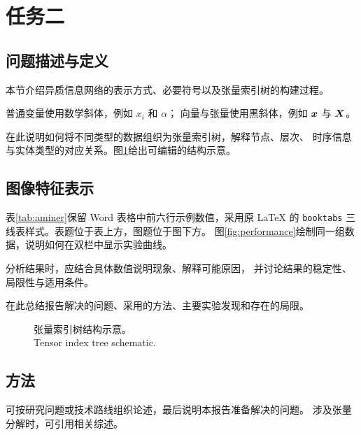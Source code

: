 \documentclass[sigconf,nonacm,screen]{acmart}
\begin{document}
\section{任务二}
\label{sec:task2}
\subsection{问题描述与定义}
\label{sec:task2-problem}
本节介绍异质信息网络的表示方式、必要符号以及张量索引树的构建过程。

普通变量使用数学斜体，例如 $x_i$ 和 $\alpha$；
向量与张量使用黑斜体，例如 $\bm{x}$ 与 $\bm{X}$。

在此说明如何将不同类型的数据组织为张量索引树，解释节点、层次、
时序信息与实体类型的对应关系。图\ref{fig:tree}给出可编辑的结构示意。

\subsection{图像特征表示}
\label{sec:task2-feature}
表\ref{tab:aminer}保留 Word 表格中前六行示例数值，采用原 LaTeX
的 \texttt{booktabs} 三线表样式。表题位于表上方，图题位于图下方。
图\ref{fig:performance}绘制同一组数据，说明如何在双栏中显示实验曲线。

分析结果时，应结合具体数值说明现象、解释可能原因，
并讨论结果的稳定性、局限性与适用条件。

在此总结报告解决的问题、采用的方法、主要实验发现和存在的局限。

\begin{figure}[tbp]
  \centering
  \caption{张量索引树结构示意。\\Tensor index tree schematic.}
  \label{fig:tree}
\end{figure}

\subsection{方法}
\label{sec:task2-method}
可按研究问题或技术路线组织论述，最后说明本报告准备解决的问题。
涉及张量分解时，可引用相关综述\cite{kolda2009}。
\end{document}
